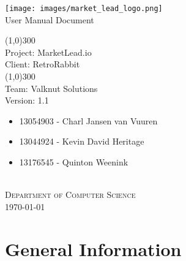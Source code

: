 \documentclass{article}
\begin{document}
	\begin{titlepage}
		\begin{center}
			\texttt{[image: images/market\_lead\_logo.png]}  \\
			[0.5cm]
			\huge{
			User Manual Document\\
			}
			
			\line(1,0){300}\\
			[0.2cm]
			\LARGE{Project: MarketLead.io\\
			Client: RetroRabbit} \\
			\line(1,0){300}\\
			\LARGE{Team: Valknut Solutions}\\
			[1.0cm]
			\large{Version: 1.1}\\
			[1.0cm]
			\large
			{
			\begin{itemize}
				\item 13054903 - Charl Jansen van Vuuren
				\item 13044924 - Kevin David Heritage
				\item 13176545 - Quinton Weenink\\
			\end{itemize}
			}
			\textsc{\large}\\
		[3.0cm]
		\textsc{\large  Department of Computer Science}\\
		[0.5cm]
		\textsc{\large \today}\\
		\end{center}
	\end{titlepage}
	
	\cleardoublepage
	\begin{versionhistory}
	\end{versionhistory}	
	
	\cleardoublepage
	\tableofcontents
	\cleardoublepage
	
	\section{General Information}
\end{document}
